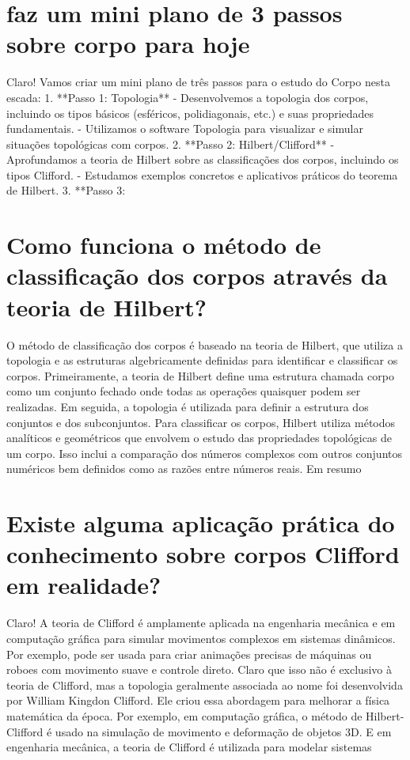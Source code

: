 \documentclass[11pt,a4paper]{article}
\begin{document}
\section{faz um mini plano de 3 passos sobre corpo para hoje}
Claro! Vamos criar um mini plano de três passos para o estudo do Corpo nesta escada: 1. **Passo 1: Topologia** - Desenvolvemos a topologia dos corpos, incluindo os tipos básicos (esféricos, polidiagonais, etc.) e suas propriedades fundamentais. - Utilizamos o software Topologia para visualizar e simular situações topológicas com corpos. 2. **Passo 2: Hilbert/Clifford** - Aprofundamos a teoria de Hilbert sobre as classificações dos corpos, incluindo os tipos Clifford. - Estudamos exemplos concretos e aplicativos práticos do teorema de Hilbert. 3. **Passo 3:

\section{Como funciona o método de classificação dos corpos através da teoria de Hilbert?}
O método de classificação dos corpos é baseado na teoria de Hilbert, que utiliza a topologia e as estruturas algebricamente definidas para identificar e classificar os corpos. Primeiramente, a teoria de Hilbert define uma estrutura chamada corpo como um conjunto fechado onde todas as operações quaisquer podem ser realizadas. Em seguida, a topologia é utilizada para definir a estrutura dos conjuntos e dos subconjuntos. Para classificar os corpos, Hilbert utiliza métodos analíticos e geométricos que envolvem o estudo das propriedades topológicas de um corpo. Isso inclui a comparação dos números complexos com outros conjuntos numéricos bem definidos como as razões entre números reais. Em resumo

\section{Existe alguma aplicação prática do conhecimento sobre corpos Clifford em realidade?}
Claro! A teoria de Clifford é amplamente aplicada na engenharia mecânica e em computação gráfica para simular movimentos complexos em sistemas dinâmicos. Por exemplo, pode ser usada para criar animações precisas de máquinas ou roboes com movimento suave e controle direto. Claro que isso não é exclusivo à teoria de Clifford, mas a topologia geralmente associada ao nome foi desenvolvida por William Kingdon Clifford. Ele criou essa abordagem para melhorar a física matemática da época. Por exemplo, em computação gráfica, o método de Hilbert-Clifford é usado na simulação de movimento e deformação de objetos 3D. E em engenharia mecânica, a teoria de Clifford é utilizada para modelar sistemas
\end{document}

